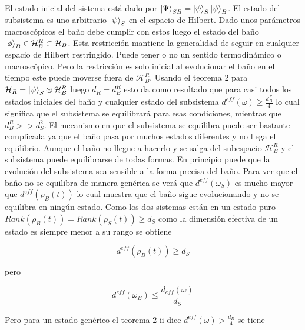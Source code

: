El estado inicial del sistema está dado por $\ket{\Psi}_{SB}=\ket{\psi}_{S} \ket{\psi}_{B}$. El estado del subsistema es uno arbitrario $\ket{\psi}_{S}$ en el espacio de Hilbert. Dado unos parámetros macroscópicos el baño  debe cumplir con estos luego el estado del baño $\ket{\phi}_{B} \in \mathcal{H}_{B}^{R} \subset\mathcal{H}_{B}$. Esta restricción mantiene la generalidad de seguir en cualquier espacio de Hilbert restringido. Puede tener o no un sentido termodinámico o macroscópico. Pero la restricción es solo inicial al evolucionar el baño en el tiempo este puede moverse fuera de $\mathcal{H}_{B}^{R}$. Usando el teorema 2 para $\mathcal{H}_{R}= \ket{\psi}_{S} \otimes \mathcal{H}_{B}^{R}$ luego $d_{R}=d_{B}^{R}$ esto da como resultado que para casi todos los estados iniciales del baño y cualquier estado del subsistema $d^{eff}(\omega) \geq \frac{d_{B}^{R}}{4}$ lo cual significa que el subsistema se equilibrará para esas condiciones, mientras que $d_{B}^{R} >> d_{S}^{2}$.
El mecanismo en que el subsistema se equilibra puede ser bastante complicada ya que el baño pasa por muchos estados diferentes y no llega el equilibrio. Aunque el baño no llegue a hacerlo y se salga del subespacio $\mathcal{H}_{B}^{R}$ y el subsistema  puede equilibrarse de todas formas. En principio puede que la evolución del subsistema sea sensible a la forma precisa del baño.
Para ver que el baño no se equilibra de manera genérica se verá que $d^{eff}(\omega_{S})$ es mucho mayor que $d^{eff}(\rho_{B}(t))$ lo cual muestra que el baño sigue evolucionando y no se equilibra en ningún estado. Como los dos sistemas están en un estado puro $Rank(\rho_{B}(t))=Rank(\rho_{S}(t)) \geq d_{S}$ como la dimensión efectiva de un estado es siempre menor a su rango se obtiene 

\begin{equation}
d^{eff}(\rho_{B}(t)) \geq d_{S}
\end{equation}

pero 

\begin{equation}
d^{eff}(\omega_{B})\leq \frac{d_{eff}(\omega)}{d_{S}}
\end{equation}

Pero para un estado genérico el teorema 2 ii dice $d^{eff}(\omega) > \frac{d_{R}}{4}$ se tiene


